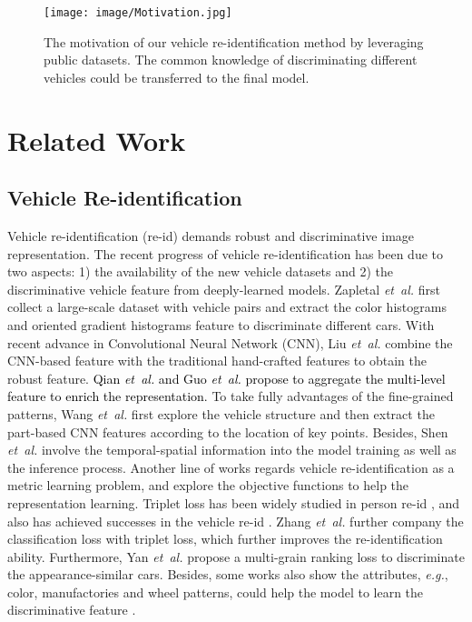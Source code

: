 \documentclass[journal]{IEEEtran}
\def\eg{\emph{e.g.}}
\def\etal{\emph{et~al.}}
\newcommand{\zznote}[1]{\textcolor{black}{#1}}
\begin{document}
\begin{figure}[t]
\begin{center}
\texttt{[image: image/Motivation.jpg]}
\end{center}
\vspace{-.2in}
   \caption{The motivation of our vehicle re-identification method by leveraging public datasets. The common knowledge of discriminating different vehicles could be transferred to the final model.}
\label{fig:motivation}
\vspace{-.1in}
\end{figure}

\section{Related Work} \label{sec:relatedwork}
\subsection{Vehicle Re-identification}
Vehicle re-identification (re-id) demands robust and discriminative image representation. The recent progress of vehicle re-identification has been due to two aspects: 1) the availability of the new vehicle datasets \cite{tang@cityflow,liu2016deep,liu2016pku,yan2017exploiting} and 2) the discriminative vehicle feature from deeply-learned models.
Zapletal \etal \cite{zapletal2016vehicle} first collect a large-scale dataset with vehicle pairs and extract the color histograms and oriented gradient histograms feature to discriminate different cars. With recent advance in Convolutional Neural Network (CNN), Liu \etal \cite{liu2016large} combine the CNN-based feature with the traditional hand-crafted features to obtain the robust feature. \zznote{Qian \etal \cite{qian2017multi} and Guo \etal \cite{guo2018learning} propose to aggregate the multi-level feature to enrich the representation.} To take fully advantages of the fine-grained patterns, Wang \etal  \cite{wang2017orientation} first explore the vehicle structure and then extract the part-based CNN features according to the location of key points. Besides, Shen \etal \cite{shen2017learning} involve the temporal-spatial information into the model training as well as the inference process. Another line of works regards vehicle re-identification as a metric learning problem, and explore the objective functions to help the representation learning. Triplet loss has been widely studied in person re-id \cite{hermans2017defense,zheng2017dual,ding2020adaptive}, and also has achieved successes in the vehicle re-id \cite{liu2016deep}. Zhang \etal \cite{zhang2017improving} further company the classification loss with triplet loss, which further improves the re-identification ability.
Furthermore, Yan \etal \cite{yan2017exploiting} propose a multi-grain ranking loss to discriminate the appearance-similar cars. Besides, some works also show the attributes, \eg, color, manufactories and wheel patterns, could help the model to learn the discriminative feature \cite{lin2017improving,tang@cityflow,wang2018transferable}.
\end{document}
